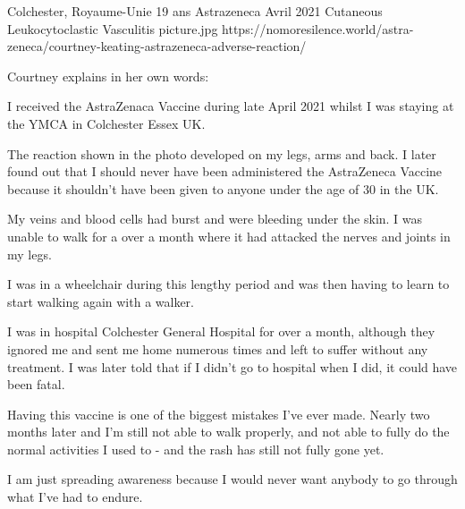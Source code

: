           {Colchester, Royaume-Unie}
          {19 ans}
          {Astrazeneca}
          {Avril 2021}
          {Cutaneous Leukocytoclastic Vasculitis}
          {picture.jpg}
          {https://nomoresilence.world/astra-zeneca/courtney-keating-astrazeneca-adverse-reaction/}
          {

Courtney explains in her own words:

I received the AstraZenaca Vaccine during late April 2021 whilst I was staying
at the YMCA in Colchester Essex UK.

The reaction shown in the photo developed on my legs, arms and back. I later
found out that I should never have been administered the AstraZeneca Vaccine
because it shouldn't have been given to anyone under the age of 30 in the UK.

My veins and blood cells had burst and were bleeding under the skin. I was
unable to walk for a over a month where it had attacked the nerves and joints in
my legs.

I was in a wheelchair during this lengthy period and was then having to learn to
start walking again with a walker.

I was in hospital Colchester General Hospital for over a month, although they
ignored me and sent me home numerous times and left to suffer without any
treatment. I was later told that if I didn’t go to hospital when I did, it could
have been fatal.

Having this vaccine is one of the biggest mistakes I’ve ever made. Nearly two
months later and I'm still not able to walk properly, and not able to fully do
the normal activities I used to - and the rash has still not fully gone yet.

I am just spreading awareness because I would never want anybody to go through
what I've had to endure.

}
